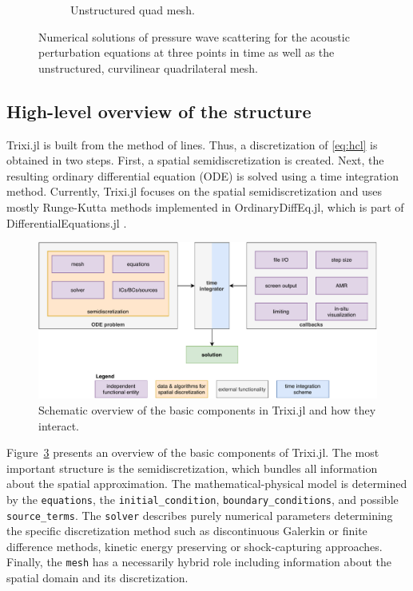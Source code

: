 \documentclass[hidelinks]{juliacon} %
\newcommand{\trixi}{Trixi.jl\xspace}
\begin{document}
\begin{figure}[!h]
\begin{subfigure}{0.475\linewidth}
    \caption{Unstructured quad mesh.}
    \label{fig:ginger_mesh}
  \end{subfigure}%
  \caption{Numerical solutions of pressure wave scattering for the acoustic
                perturbation equations at three points in time as well as the unstructured,
                curvilinear quadrilateral mesh.}
  \label{fig:pressure_waves}
\end{figure}


\subsection{High-level overview of the structure}

\trixi is built from the method of lines. Thus, a discretization of \eqref{eq:hcl}
is obtained in two steps. First, a spatial semidiscretization is created. Next,
the resulting ordinary differential equation (ODE) is solved using a time
integration method. Currently, \trixi focuses on the spatial semidiscretization
and uses mostly Runge-Kutta methods implemented in OrdinaryDiffEq.jl, which is part
of DifferentialEquations.jl \cite{rackauckas2017differentialequations}.

\begin{figure}[htbp]
  \includegraphics[width=\linewidth]{../figures/trixi_global_overview}
  \caption{Schematic overview of the basic components in \trixi and how they
           interact.}
  \label{fig:trixi_global_overview}
\end{figure}

Figure~\ref{fig:trixi_global_overview} presents an overview of the basic
components of \trixi. The most important structure is the semidiscretization,
which bundles all information about the spatial approximation. The mathematical-physical
model is determined by the \lstinline{equations}, the \lstinline{initial_condition},
\lstinline{boundary_conditions}, and possible \lstinline{source_terms}. The
\lstinline{solver} describes purely numerical parameters determining the specific
discretization method such as discontinuous Galerkin or finite difference
methods, kinetic energy preserving or shock-capturing approaches. Finally, the
\lstinline{mesh} has a necessarily hybrid role including information about the
spatial domain and its discretization.
\end{document}
